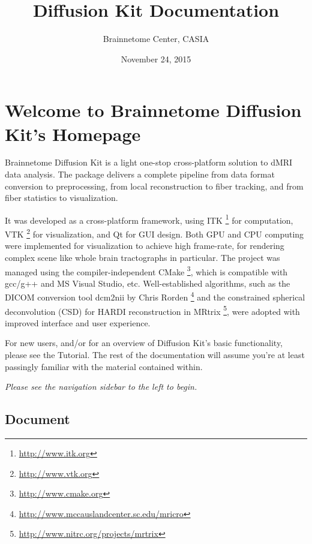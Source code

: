 \documentclass[letterpaper,10pt,english]{sphinxmanual}
\title{Diffusion Kit Documentation}
\date{November 24, 2015}
\author{Brainnetome Center, CASIA}
\begin{document}
\maketitle
\tableofcontents
{}\label{index::doc}



\chapter{Welcome to Brainnetome Diffusion Kit's Homepage}
\label{index:welcome-to-brainnetome-diffusion-kit-s-homepage}\label{index:homepage}
Brainnetome Diffusion Kit is a light one-stop cross-platform solution to dMRI data analysis.
The package delivers a complete pipeline from data format conversion to preprocessing,
from local reconstruction to fiber tracking, and from fiber statistics to visualization.

It was developed as a cross-platform framework,
using ITK \footnote{
\href{http://www.itk.org}{http://www.itk.org}
} for computation, VTK \footnote{
\href{http://www.vtk.org}{http://www.vtk.org}
} for visualization, and Qt for GUI design.
Both GPU and CPU computing were implemented for visualization to achieve high frame-rate,
for rendering complex scene like whole brain tractographs in particular.
The project was managed using the compiler-independent CMake \footnote{
\href{http://www.cmake.org}{http://www.cmake.org}
},
which is compatible with gcc/g++ and MS Visual Studio, etc.
Well-established algorithms, such as the DICOM conversion tool dcm2nii by
Chris Rorden \footnote{
\href{http://www.mccauslandcenter.sc.edu/mricro}{http://www.mccauslandcenter.sc.edu/mricro}
} and the constrained spherical deconvolution (CSD) for
HARDI reconstruction in MRtrix \footnote{
\href{http://www.nitrc.org/projects/mrtrix}{http://www.nitrc.org/projects/mrtrix}
}, were adopted with improved interface and user experience.

For new users, and/or for an overview of Diffusion Kit’s basic functionality,
please see the Tutorial.
The rest of the documentation will assume you’re at least passingly familiar with the
material contained within.

\emph{Please see the navigation sidebar to the left to begin.}


\section{Document}
\label{document:document}\label{document::doc}
\end{document}
